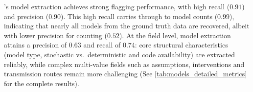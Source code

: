 \name's model extraction achieves strong flagging performance, with high recall ($0.91$) and precision ($0.90$). This high recall carries through to model counts ($0.99$), indicating that nearly all models from the ground truth data are recovered, albeit with lower precision for counting ($0.52$). At the field level, model extraction attains a precision of $0.63$ and recall of $0.74$: core structural characteristics (model type, stochastic vs.\ deterministic and code availability) are extracted reliably, while complex multi-value fields such as assumptions, interventions and transmission routes remain more challenging (See \cref{tab:models_detailed_metrics} for the complete results).



